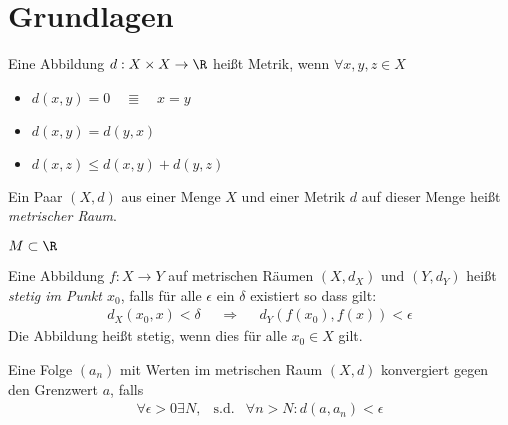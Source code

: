 \section{Grundlagen}
\begin{dfn}
    Eine Abbildung $d: X \times X \to \R$ heißt Metrik, wenn
    $\forall x,y,z \in X$
    \begin{itemize}
    \item $d(x, y) = 0 \quad \Equiv \quad x = y$
    \item $d(x, y) = d(y, x)$
    \item $d(x, z) \leq d(x, y) + d(y, z)$
    \end{itemize}
    Ein Paar $(X, d)$ aus einer Menge $X$ und einer Metrik $d$ auf dieser
    Menge heißt \emph{metrischer Raum}.    
\end{dfn}

\begin{bsp}
\end{bsp}

\begin{bsp}
\end{bsp}

\begin{bsp}[Unterraummetrik]
\end{bsp}

\begin{bsp}
    $M \subset \R$
\end{bsp}

\begin{dfn}[Stetigkeit]
    Eine Abbildung $f: X \to Y$ auf metrischen Räumen $(X,d_X)$ und $(Y, d_Y)$ heißt
    \emph{stetig im Punkt $x_0$}, falls für alle $\epsilon$ ein $\delta$ existiert
    so dass gilt:
    \begin{align*}
        d_X(x_0, x) < \delta& &\Rightarrow& &d_Y(f(x_0), f(x)) < \epsilon
    \end{align*}
    Die Abbildung heißt stetig, wenn dies für alle $x_0\in X$ gilt.
\end{dfn}

\begin{dfn}[Folgenkonvergenz]
    Eine Folge $(a_n)$ mit Werten im metrischen Raum $(X, d)$ konvergiert gegen den
    Grenzwert $a$, falls \begin{align*}
        \forall \epsilon > 0 \exists N, &\text{s.d.}& \forall n > N: d(a, a_n) < \epsilon
    \end{align*}
\end{dfn}

